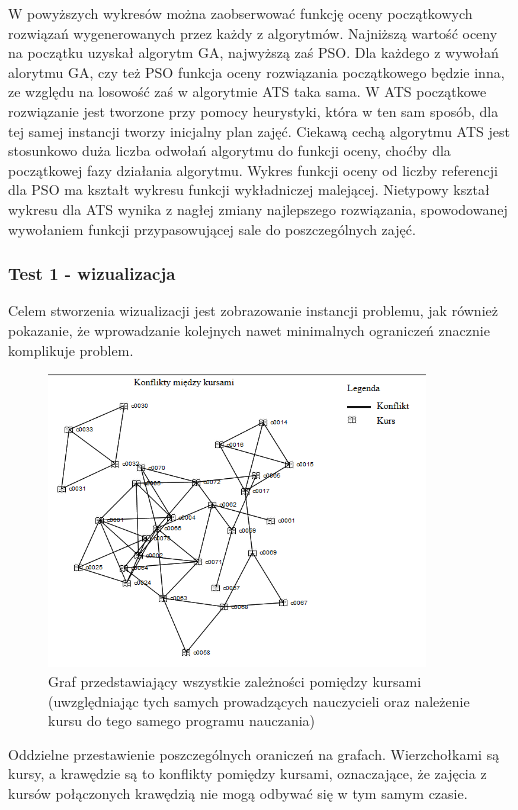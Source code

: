 W powyższych wykresów można zaobserwować funkcję oceny początkowych rozwiązań wygenerowanych przez każdy z algorytmów. Najniższą wartość oceny na początku uzyskał algorytm GA, najwyższą zaś PSO. Dla każdego z wywołań alorytmu GA, czy też PSO funkcja oceny rozwiązania początkowego będzie inna, ze względu na losowość zaś w algorytmie ATS taka sama. W ATS początkowe rozwiązanie jest tworzone przy pomocy heurystyki, która w ten sam sposób, dla tej samej instancji tworzy inicjalny plan zajęć. Ciekawą cechą algorytmu ATS jest stosunkowo duża liczba odwołań algorytmu do funkcji oceny, choćby dla początkowej fazy działania algorytmu. Wykres funkcji oceny od liczby referencji dla PSO ma kształt wykresu funkcji wykładniczej malejącej. Nietypowy kształ wykresu dla ATS wynika z nagłej zmiany najlepszego rozwiązania, spowodowanej wywołaniem funkcji przypasowującej sale do poszczególnych zajęć. 
\subsubsection{Test 1 - wizualizacja}
Celem stworzenia wizualizacji jest zobrazowanie instancji problemu, jak również pokazanie, że wprowadzanie kolejnych nawet minimalnych ograniczeń znacznie komplikuje problem.
\begin{figure}[H]
  \caption{Graf przedstawiający wszystkie zależności pomiędzy kursami (uwzględniając tych samych prowadzących nauczycieli oraz należenie kursu do tego samego programu nauczania) }
  \centering
    \includegraphics[width=10cm]{test1.PNG}
\end{figure}
\par Oddzielne przestawienie poszczególnych oraniczeń na grafach. Wierzchołkami są kursy, a krawędzie są to konflikty pomiędzy kursami, oznaczające, że zajęcia z kursów połączonych krawędzią nie mogą odbywać się w tym samym czasie.

